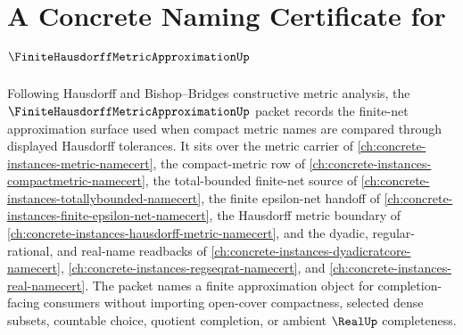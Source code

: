\chapter{A Concrete Naming Certificate for $\FiniteHausdorffMetricApproximationUp$}
\label{ch:concrete-instances-finite-hausdorff-metric-approximation-namecert}

Following Hausdorff and Bishop--Bridges constructive metric analysis, the $\FiniteHausdorffMetricApproximationUp$ packet records the finite-net approximation surface used when compact metric names are compared through displayed Hausdorff tolerances. It sits over the metric carrier of \autoref{ch:concrete-instances-metric-namecert}, the compact-metric row of \autoref{ch:concrete-instances-compactmetric-namecert}, the total-bounded finite-net source of \autoref{ch:concrete-instances-totallybounded-namecert}, the finite epsilon-net handoff of \autoref{ch:concrete-instances-finite-epsilon-net-namecert}, the Hausdorff metric boundary of \autoref{ch:concrete-instances-hausdorff-metric-namecert}, and the dyadic, regular-rational, and real-name readbacks of \autoref{ch:concrete-instances-dyadicratcore-namecert}, \autoref{ch:concrete-instances-regseqrat-namecert}, and \autoref{ch:concrete-instances-real-namecert}. The packet names a finite approximation object for completion-facing consumers without importing open-cover compactness, selected dense subsets, countable choice, quotient completion, or ambient $\RealUp$ completeness.

